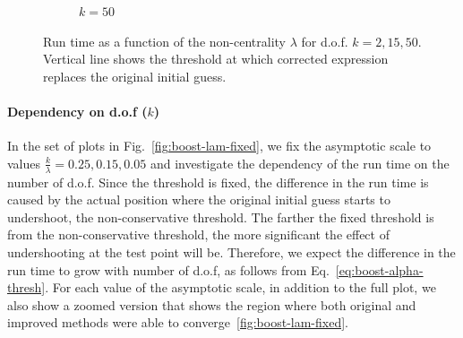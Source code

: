 \documentclass[final,5p,twocolumn,preprint,nopreprintline,times,authoryear]{elsarticle}
\begin{document}
\begin{figure}[h]
\begin{subfigure}[t]{0.35\textwidth}
		\caption{$k=50$}
	\end{subfigure}
	\caption{Run time as a function of the non-centrality $\lambda$ for d.o.f. $k=2,15,50$. Vertical line shows the threshold at which corrected expression replaces the original initial guess.}\label{fig:boost-k-fixed}
\end{figure}
%
\paragraph{Dependency on d.o.f ($k$)} In the set of plots in Fig.~\ref{fig:boost-lam-fixed}, we fix the asymptotic scale to values $\frac{k}{\lambda} = 0.25, 0.15, 0.05$ and investigate the dependency of the run time on the number of d.o.f. Since the threshold is fixed, the difference in the run time is caused by the actual position where the original initial guess starts to undershoot, the non-conservative threshold. The farther the fixed threshold is from the non-conservative threshold, the more significant the effect of undershooting at the test point will be. Therefore, we expect the difference in the run time to grow with number of d.o.f, as follows from Eq.~\ref{eq:boost-alpha-thresh}. For each value of the asymptotic scale, in addition to the full plot, we also show a zoomed version that shows the region where both original and improved methods were able to converge~\ref{fig:boost-lam-fixed}.
%
\end{document}
